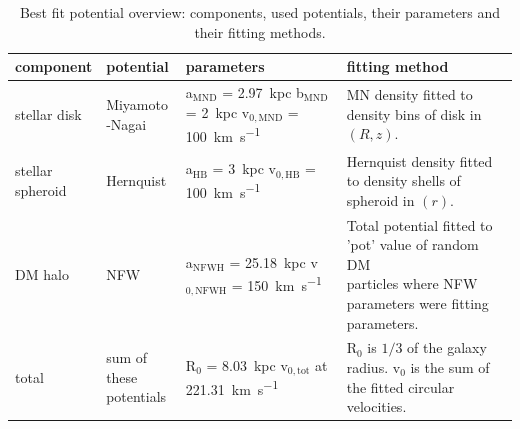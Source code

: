 \begin{table}[htbp]
    \centering
    \begin{tabular}{@{}llll@{}}
         \toprule
         component& potential & parameters &fitting method  \\
         \midrule
         stellar disk& \makecell[tl]{Miyamoto\\-Nagai}&\makecell[tl]{a$_{\mathrm{MND}}$ = \SI{2.97}{kpc}\\b$_{\mathrm{MND}}$ = \SI{2}{kpc}\\v$_{0,\mathrm{MND}}$ = \SI{100}{km.s^{-1}}} & \makecell[tl]{\ac{MN} \\density fitted to density\\ bins of disk in $(R,z)$.}\vspace{3mm}\\
         \makecell[tl]{stellar\\ spheroid}& Hernquist&\makecell[tl]{a$_{\mathrm{HB}}$ = \SI{3}{kpc}\\v$_{0,\mathrm{HB}}$ = \SI{100}{km.s^{-1}}}& \makecell[tl]{Hernquist density fitted\\ to density shells of \\spheroid in $(r)$.}\vspace{3mm}\\
         \ac{DM} halo&\ac{NFW}&\makecell[tl]{a$_{\mathrm{NFWH}}$ = \SI{25.18}{kpc}\\v$_{0,\mathrm{NFWH}}$ = \SI{150}{km.s^{-1}}}&\makecell[tl]{Total potential fitted to \\'pot' value of random \ac{DM} \\particles where \ac{NFW}\\ parameters were fitting \\parameters.}\vspace{3mm}\\
         total & \makecell[tl]{sum of these\\ potentials} & \makecell[tl]{R$_0$ = \SI{8.03}{kpc} \\ v$_{0,\mathrm{tot}}$ at \SI{221.31}{km.s^{-1}}}& \makecell[tl]{R$_0$ is $1/3$ of the galaxy \\radius. v$_0$ is the sum of \\the fitted circular velocities.}\vspace{3mm}\\
         \bottomrule 
    \end{tabular}
    \caption{Best fit potential overview: components, used potentials, their parameters and their fitting methods.}
    \label{tab:pot_best_fit_params}
\end{table}


